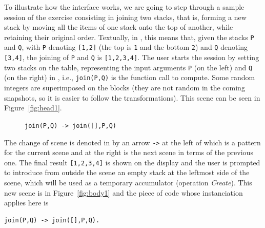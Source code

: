 To illustrate how the interface works, we are going to step through a
sample session of the exercise consisting in joining two stacks, that
is, forming a new stack by moving all the items of one stack onto the
top of another, while retaining their original order. Textually, in
\erlang, this means that, given the stacks \texttt{P} and \texttt{Q},
with \texttt{P} denoting \texttt{[1,2]} (the top is \texttt{1} and the
bottom \texttt{2}) and \texttt{Q} denoting \texttt{[3,4]}, the joining
of \texttt{P} and \texttt{Q} is \texttt{[1,2,3,4]}. The user starts
the session by setting two stacks on the table, representing the input
arguments \texttt{P} (on the left) and \texttt{Q} (on the right) in
\erlang, i.e., \texttt{join(P,Q)} is the function call to
compute. Some random integers are superimposed on the blocks (they are
not random in the coming snapshots, so it is easier to follow the
transformations). This scene can be seen in
Figure~\ref{fig:head1}. 
\begin{figure}[!h]
\centering
{}
\quad
{}
\caption{\texttt{\small join(P,Q) -> join([],P,Q)}
\label{fig:clause1}}
\end{figure}
The change of scene is denoted in \erlang by an arrow \texttt{->} at
the left of which is a pattern for the current scene and at the right
is the next scene in terms of the previous one. The final result
\texttt{[1,2,3,4]} is shown on the display and the user is prompted to
introduce from outside the scene an empty stack at the leftmost side
of the scene, which will be used as a temporary accumulator (operation
\textsl{Create}). This new scene is in Figure~\ref{fig:body1} and the
\erlang piece of code whose instanciation applies here is {\small
\begin{verbatim}
join(P,Q) -> join([],P,Q).
\end{verbatim}
}
